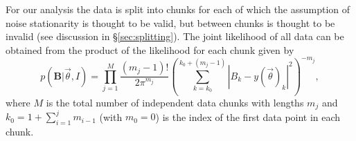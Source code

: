 For our analysis the data is split into chunks for each of which the assumption of noise stationarity is
thought to be valid, but between chunks is thought to be invalid (see discussion in \S\ref{sec:splitting}). The joint likelihood of all data can be
obtained from the product of the likelihood for each chunk given by
\begin{equation}\label{eq:prod}
p(\mathbf{B}|\vec{\theta},I) = \prod_{j=1}^M \frac{(m_j-1)!}{2\pi^{m_j}}
\left(\sum_{k=k_0}^{k_0+(m_j-1)} |B_k-y(\vec{\theta})_k|^2\right)^{-m_j},
\end{equation}
where $M$ is the total number of independent data chunks with lengths $m_j$ and $k_0 = 1+\sum_{i=1}^{j}
m_{i-1}$ (with $m_0 = 0$) is the index of the first data point in each chunk.
